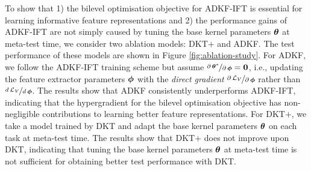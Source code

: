         To show that 1) the bilevel optimisation objective for ADKF-IFT is essential for
        learning informative feature representations and 2) the performance gains of ADKF-IFT
        are not simply caused by tuning the base kernel parameters $\operatorname{\boldsymbol{\theta}}$ at meta-test time,
        we consider two ablation models: DKT$+$ and ADKF. The test performance of these models are
        shown in Figure \ref{fig:ablation-study}. For ADKF, we follow the ADKF-IFT training scheme
        but assume $\nicefrac{\partial\operatorname{\boldsymbol{\theta}}^*}{\partial\operatorname{\boldsymbol{\phi}}}=\operatorname{\mathbf{0}}$, i.e., updating the feature
        extractor parameters $\operatorname{\boldsymbol{\phi}}$ with the \emph{direct gradient}
        $\nicefrac{\partial \operatorname{\mathcal{L}}_V}{\partial\operatorname{\boldsymbol{\phi}}}$ rather than $\nicefrac{d\operatorname{\mathcal{L}}_V}{d\operatorname{\boldsymbol{\phi}}}$.
        The results show that ADKF consistently underperforms ADKF-IFT, indicating that the
        hypergradient for the bilevel optimisation objective has non-negligible contributions
        to learning better feature representations. For DKT$+$, we take a model trained by DKT
        and adapt the base kernel parameters $\operatorname{\boldsymbol{\theta}}$ on each task at meta-test time.
        The results show that DKT$+$ does not improve upon DKT, indicating that tuning the
        base kernel parameters $\operatorname{\boldsymbol{\theta}}$ at meta-test time is not sufficient for obtaining
        better test performance with DKT.
        
